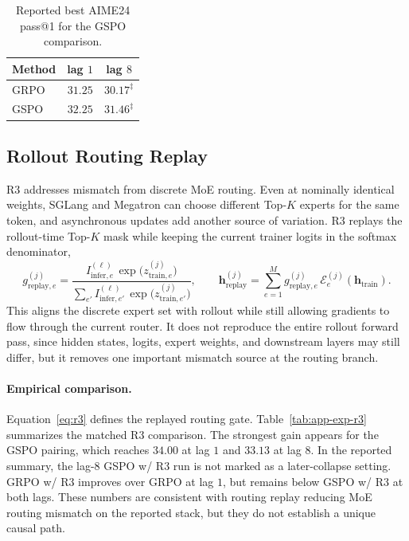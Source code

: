 \begin{table}[h]
\centering
\caption{Reported best AIME24 pass@1 for the GSPO comparison.}
\label{tab:app-exp-gspo}
\small
\begin{tabular}{@{}lcc@{}}
\toprule
Method & lag $1$ & lag $8$ \\
\midrule
GRPO & $31.25$ & $30.17^{\ddagger}$ \\
GSPO & $32.25$ & $31.46^{\ddagger}$ \\
\bottomrule
\end{tabular}
\end{table}

\subsection{Rollout Routing Replay}
\label{app:r3-detail}

R3 addresses mismatch from discrete MoE routing. Even at nominally identical weights, SGLang and Megatron can choose different Top-$K$ experts for the same token, and asynchronous updates add another source of variation. R3 replays the rollout-time Top-$K$ mask while keeping the current trainer logits in the softmax denominator,
\begin{equation}
g^{(j)}_{\mathrm{replay},e}
=\frac{I^{(\ell)}_{\mathrm{infer},e}\,\exp\bigl(z^{(j)}_{\mathrm{train},e}\bigr)}
{\sum_{e'}I^{(\ell)}_{\mathrm{infer},e'}\,\exp\bigl(z^{(j)}_{\mathrm{train},e'}\bigr)},
\qquad
\mathbf h^{(j)}_{\mathrm{replay}}
=\sum_{e=1}^{M}g^{(j)}_{\mathrm{replay},e}\,\mathcal E_e^{(j)}(\mathbf h_{\mathrm{train}}).
\label{eq:r3}
\end{equation}
This aligns the discrete expert set with rollout while still allowing gradients to flow through the current router. It does not reproduce the entire rollout forward pass, since hidden states, logits, expert weights, and downstream layers may still differ, but it removes one important mismatch source at the routing branch.

\paragraph{Empirical comparison.}
Equation~\eqref{eq:r3} defines the replayed routing gate. Table~\ref{tab:app-exp-r3} summarizes the matched R3 comparison. The strongest gain appears for the GSPO pairing, which reaches $34.00$ at lag $1$ and $33.13$ at lag $8$. In the reported summary, the lag-$8$ GSPO w/ R3 run is not marked as a later-collapse setting. GRPO w/ R3 improves over GRPO at lag $1$, but remains below GSPO w/ R3 at both lags. These numbers are consistent with routing replay reducing MoE routing mismatch on the reported stack, but they do not establish a unique causal path.


